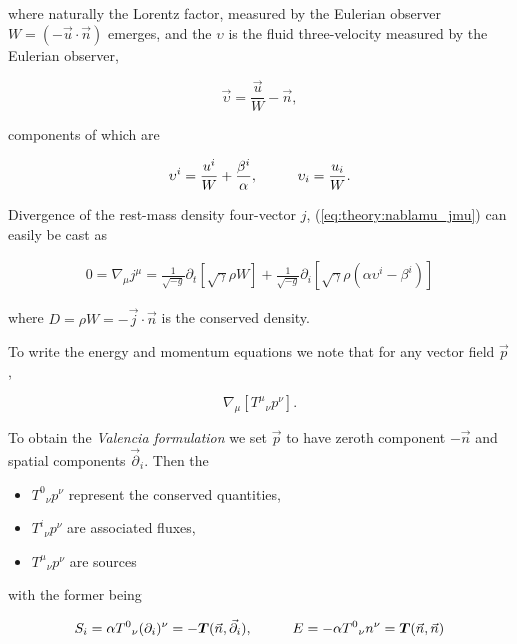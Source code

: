 where naturally the Lorentz factor, measured by the Eulerian observer 
$W = (-\vec{u}\cdot\vec{n})$ emerges, and the $\upsilon$ is the fluid three-velocity measured by the Eulerian observer, 

\begin{equation}
\vec{\upsilon} = \frac{\vec{u}}{W} -\vec{n},
\end{equation}

components of which are

\begin{equation}
\upsilon^i = \frac{u^i}{W}+ \frac{\beta^i}{\alpha}, \hspace{10mm} \upsilon_i= \frac{u_{i}}{W}.
\end{equation}

Divergence of the rest-mass density four-vector $j$, (\ref{eq:theory:nablamu_jmu}) can easily be cast as 

\begin{eqnarray}
0 = \nabla_{\mu}j^{\mu} = \frac{1}{\sqrt{-g}}\partial_{t}[\sqrt{\gamma}\rho W] + \frac{1}{\sqrt{-g}}\partial_{i}[\sqrt{\gamma}\rho(\alpha \upsilon^{i} - \beta^{i})]
\end{eqnarray}

where $D= \rho W = -\vec{j}\cdot \vec{n}$ is the conserved density.

To write the energy and momentum equations we note that for any vector field $\vec{p} $ \cite{Rezzolla:2013}, 

\begin{equation}
\nabla_{\mu}[{T^{\mu}}_{\nu}p^{\nu}].
\end{equation}

To obtain the \textit{Valencia formulation} we set $\vec{p}$ to have zeroth component $-\vec{n}$ and spatial components $\vec{\partial}_i$. 
Then the

\begin{itemize}
    \item ${T^0}_{\nu}p^{\nu}$ represent the conserved quantities,
    \item ${T^i}_{\nu}p^{\nu}$ are associated fluxes,
    \item ${T^{\mu}}_{\nu}p^{\nu}$ are sources
\end{itemize}

with the former being 

\begin{equation}
S_{i} = \alpha {T^0}_{\nu}(\partial_i)^{\nu}=-\boldsymbol{T}(\vec{n},\vec{\partial}_i), \hspace{10mm} E = -\alpha{T^0}_{\nu}n^{\nu} = \boldsymbol{T}(\vec{n},\vec{n})
\end{equation}

